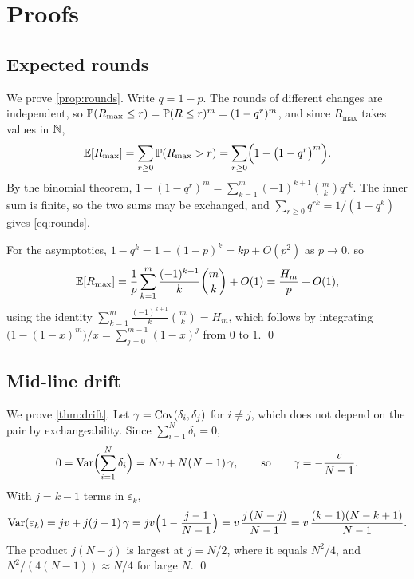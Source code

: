\section{Proofs}
\label{app:proofs}

\subsection{Expected rounds}

We prove \cref{prop:rounds}. Write $q = 1 - p$. The rounds of different changes are independent, so
$\mathbb{P}(R_{\max} \le r) = \mathbb{P}(R \le r)^{m} = (1 - q^{r})^{m}$, and since
$R_{\max}$ takes values in $\mathbb{N}$,
\begin{equation}
  \mathbb{E}[R_{\max}] = \sum_{r \ge 0} \mathbb{P}(R_{\max} > r)
  = \sum_{r \ge 0} \Bigl( 1 - \bigl(1 - q^{r}\bigr)^{m} \Bigr).
\end{equation}
By the binomial theorem,
$1 - (1 - q^{r})^{m} = \sum_{k=1}^{m} (-1)^{k+1} \binom{m}{k} q^{rk}$. The inner
sum is finite, so the two sums may be exchanged, and
$\sum_{r \ge 0} q^{rk} = 1 / (1 - q^{k})$ gives \cref{eq:rounds}.

For the asymptotics, $1 - q^{k} = 1 - (1-p)^{k} = kp + O(p^2)$ as $p \to 0$, so
\begin{equation}
  \mathbb{E}[R_{\max}] = \frac{1}{p} \sum_{k=1}^{m} \frac{(-1)^{k+1}}{k} \binom{m}{k}
  + O(1)
  = \frac{H_m}{p} + O(1),
\end{equation}
using the identity $\sum_{k=1}^{m} \frac{(-1)^{k+1}}{k}\binom{m}{k} = H_m$,
which follows by integrating $\bigl(1 - (1-x)^{m}\bigr)/x
= \sum_{j=0}^{m-1} (1-x)^{j}$ from $0$ to $1$. \qed

\subsection{Mid-line drift}

We prove \cref{thm:drift}. Let $\gamma = \operatorname{Cov}(\delta_i, \delta_j)$ for $i \ne j$, which does not depend on the
pair by exchangeability. Since $\sum_{i=1}^{N} \delta_i = 0$,
\begin{equation}
  0 = \operatorname{Var}\Bigl(\sum_{i=1}^{N} \delta_i\Bigr) = N v + N(N-1)\, \gamma,
  \qquad\text{so}\qquad \gamma = -\frac{v}{N-1} .
\end{equation}
With $j = k - 1$ terms in $\varepsilon_k$,
\begin{equation}
  \operatorname{Var}(\varepsilon_k) = j v + j(j-1)\, \gamma
  = j v \Bigl(1 - \frac{j - 1}{N - 1}\Bigr)
  = v\, \frac{j\,(N - j)}{N - 1}
  = v\, \frac{(k-1)(N-k+1)}{N-1} .
\end{equation}
The product $j(N-j)$ is largest at $j = N/2$, where it equals $N^2/4$, and
$N^2/(4(N-1)) \approx N/4$ for large $N$. \qed

